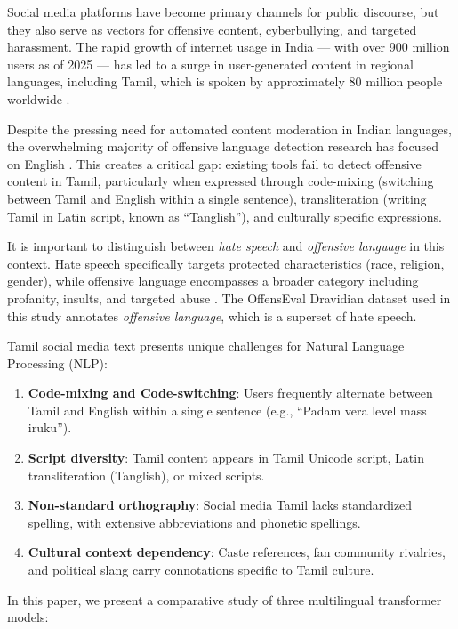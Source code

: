 \documentclass[conference]{IEEEtran}
\begin{document}
Social media platforms have become primary channels for public discourse, but they also serve as vectors for offensive content, cyberbullying, and targeted harassment. The rapid growth of internet usage in India --- with over 900 million users as of 2025 --- has led to a surge in user-generated content in regional languages, including Tamil, which is spoken by approximately 80 million people worldwide \cite{iamai2025}.

Despite the pressing need for automated content moderation in Indian languages, the overwhelming majority of offensive language detection research has focused on English \cite{fortuna2018survey}. This creates a critical gap: existing tools fail to detect offensive content in Tamil, particularly when expressed through code-mixing (switching between Tamil and English within a single sentence), transliteration (writing Tamil in Latin script, known as ``Tanglish''), and culturally specific expressions.

It is important to distinguish between \textit{hate speech} and \textit{offensive language} in this context. Hate speech specifically targets protected characteristics (race, religion, gender), while offensive language encompasses a broader category including profanity, insults, and targeted abuse \cite{davidson2017automated}. The OffensEval Dravidian dataset used in this study annotates \textit{offensive language}, which is a superset of hate speech.

Tamil social media text presents unique challenges for Natural Language Processing (NLP):

\begin{enumerate}
    \item \textbf{Code-mixing and Code-switching}: Users frequently alternate between Tamil and English within a single sentence (e.g., ``Padam vera level mass iruku'').
    \item \textbf{Script diversity}: Tamil content appears in Tamil Unicode script, Latin transliteration (Tanglish), or mixed scripts.
    \item \textbf{Non-standard orthography}: Social media Tamil lacks standardized spelling, with extensive abbreviations and phonetic spellings.
    \item \textbf{Cultural context dependency}: Caste references, fan community rivalries, and political slang carry connotations specific to Tamil culture.
\end{enumerate}

In this paper, we present a comparative study of three multilingual transformer models:
\end{document}
